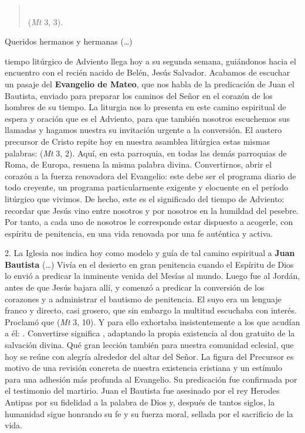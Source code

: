 \begin{body}
	\begin{quote}
		 \\(\emph{Mt} 3, 3).
	\end{quote}	
	
	Queridos hermanos y hermanas (\ldots{})
	
	 tiempo litúrgico de Adviento llega hoy a su segunda semana, guiándonos hacia el encuentro con el recién nacido de Belén, Jesús Salvador. Acabamos de escuchar un pasaje del \textbf{Evangelio de Mateo}, que nos habla de la predicación de Juan el Bautista, enviado para preparar los caminos del Señor en el corazón de los hombres de su tiempo. La liturgia nos lo presenta en este camino espiritual de espera y oración que es el Adviento, para que también nosotros escuchemos sus llamadas y hagamos nuestra su invitación urgente a la conversión. El austero precursor de Cristo repite hoy en nuestra asamblea litúrgica estas mismas palabras:  (\emph{Mt} 3, 2). Aquí, en esta parroquia, en todas las demás parroquias de Roma, de Europa, resuena la misma palabra divina. Convertirnos, abrir el corazón a la fuerza renovadora del Evangelio: este debe ser el programa diario de todo creyente, un programa particularmente exigente y elocuente en el período litúrgico que vivimos. De hecho, este es el significado del tiempo de Adviento: recordar que Jesús vino entre nosotros y por nosotros en la humildad del pesebre. Por tanto, a cada uno de nosotros le corresponde estar dispuesto a acogerle, con espíritu de penitencia, en una vida renovada por una fe auténtica y activa.
	
	2. La Iglesia nos indica hoy como modelo y guía de tal camino espiritual a \textbf{Juan Bautista} (\ldots{}) Vivía en el desierto en gran penitencia cuando el Espíritu de Dios lo envió a predicar la inminente venida del Mesías al mundo. Luego fue al Jordán, antes de que Jesús bajara allí, y comenzó a predicar la conversión de los corazones y a administrar el bautismo de penitencia. El suyo era un lenguaje franco y directo, casi grosero, que sin embargo la multitud escuchaba con interés. Proclamó que  (\emph{Mt} 3, 10). Y para ello exhortaba insistentemente a los que acudían a él: . Convertirse significa , adaptando la propia existencia al don gratuito de la salvación divina. Qué gran lección también para nuestra comunidad eclesial, que hoy se reúne con alegría alrededor del altar del Señor. La figura del Precursor es motivo de una revisión concreta de nuestra existencia cristiana y un estímulo para una adhesión más profunda al Evangelio. Su predicación fue confirmada por el testimonio del martirio. Juan el Bautista fue asesinado por el rey Herodes Antipas por su fidelidad a la palabra de Dios y, después de tantos siglos, la humanidad sigue honrando su fe y su fuerza moral, sellada por el sacrificio de la vida.
	

\end{body}
